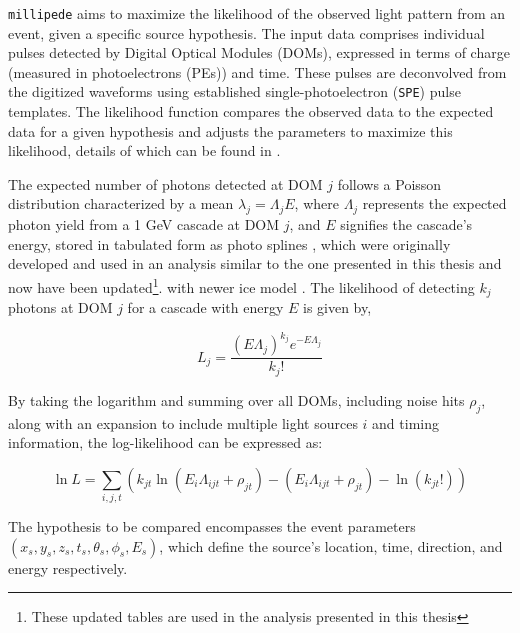 \texttt{millipede} aims to maximize the likelihood of the observed light pattern from an event, given a specific source hypothesis. The input data comprises individual pulses detected by Digital Optical Modules (DOMs), expressed in terms of charge (measured in photoelectrons (PEs)) and time. These pulses are deconvolved from the digitized waveforms using established single-photoelectron (\texttt{SPE}) pulse templates. The likelihood function compares the observed data to the expected data for a given hypothesis and adjusts the parameters to maximize this likelihood, details of which can be found in .

The expected number of photons detected at DOM $j$ follows a Poisson distribution characterized by a mean $\lambda_j = \Lambda_j E$, where $\Lambda_j$ represents the expected photon yield from a 1 GeV cascade at DOM $j$, and $E$ signifies the cascade's energy, stored in tabulated form as photo splines , which were originally developed and used in an analysis similar to the one presented in this thesis  and now have been updated\footnote{These updated tables are used in the analysis presented in this thesis}. with newer ice model . The likelihood of detecting $k_j$ photons at DOM $j$ for a cascade with energy $E$ is given by,

\begin{equation}
    L_j = \frac{(E \Lambda_j)^{k_j} e^{-E \Lambda_j}}{k_j!}
\end{equation}

By taking the logarithm and summing over all DOMs, including noise hits $\rho_j$, along with an expansion to include multiple light sources $i$ and timing information, the log-likelihood can be expressed as:

\begin{equation}\label{eq:millipede_llh}
    \ln L = \sum_{i,j,t} \left( k_{jt} \ln(E_i \Lambda_{ijt} + \rho_{jt}) - (E_i \Lambda_{ijt} + \rho_{jt}) - \ln(k_{jt}!) \right)
\end{equation}

The hypothesis to be compared encompasses the event parameters $(x_s, y_s, z_s, t_s, \theta_s, \phi_s, E_s)$, which define the source's location, time, direction, and energy respectively. 



